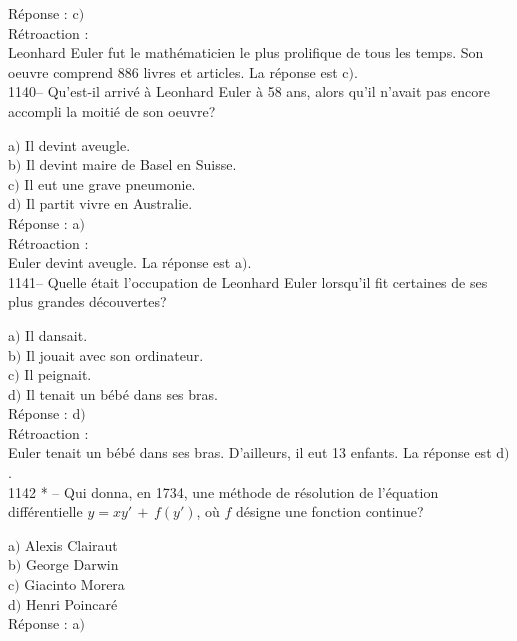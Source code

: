 ﻿\documentclass[letterpaper, 12pt]{article}
\begin{document}
R\'eponse : c$)$\\

R\'etroaction : \\
Leonhard Euler fut le math\'ematicien le plus prolifique de tous les temps.
Son oeuvre comprend 886 livres et articles. La r\'eponse est c$)$. \\

1140-- Qu'est-il arriv\'e \`a Leonhard Euler \`a 58 ans, alors qu'il
n'avait pas encore accompli la moiti\'e de son oeuvre?

a$)$ Il devint aveugle. \\
b$)$ Il devint maire de Basel en Suisse.   \\
c$)$ Il eut une grave pneumonie.   \\
d$)$ Il partit vivre en Australie.  \\

R\'eponse : a$)$\\

R\'etroaction : \\
Euler devint aveugle. La r\'eponse est a$)$. \\

1141-- Quelle \'etait l'occupation de Leonhard Euler lorsqu'il fit
certaines de ses plus grandes d\'ecouvertes?

a$)$ Il dansait. \\
b$)$ Il jouait avec son ordinateur.  \\
c$)$ Il peignait.   \\
d$)$ Il tenait un b\'eb\'e dans ses bras.  \\

R\'eponse : d$)$\\

R\'etroaction : \\
Euler tenait un b\'eb\'e dans ses bras. D'ailleurs, il eut 13 enfants. La
r\'eponse est d$)$. \\

1142 * -- Qui donna, en 1734, une m\'ethode de r\'esolution de
l'\'equation diff\'erentielle $y=xy'\,+\,f(y')$, o\`u $f$ d\'esigne
une fonction continue?

a$)$ Alexis Clairaut \\
b$)$ George Darwin   \\
c$)$ Giacinto Morera  \\
d$)$ Henri Poincar\'e \\

R\'eponse : a$)$\\
\end{document}
